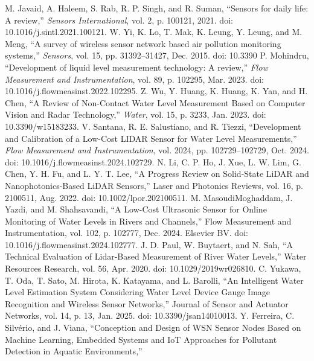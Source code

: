 \documentclass[conference]{IEEEtran}
\begin{document}
\begin{thebibliography}{00}
    
 M. Javaid, A. Haleem, S. Rab, R. P. Singh, and R. Suman, ``Sensors for daily life: A review,'' \emph{Sensors International}, vol. 2, p. 100121, 2021. doi: 10.1016/j.sintl.2021.100121.
 W. Yi, K. Lo, T. Mak, K. Leung, Y. Leung, and M. Meng, ``A survey of wireless sensor network based air pollution monitoring systems,'' \emph{Sensors}, vol. 15, pp. 31392--31427, Dec. 2015. doi: 10.3390
 P. Mohindru, ``Development of liquid level measurement technology: A review,'' \emph{Flow Measurement and Instrumentation}, vol. 89, p. 102295, Mar. 2023. doi: 10.1016/j.flowmeasinst.2022.102295.
 Z. Wu, Y. Huang, K. Huang, K. Yan, and H. Chen, ``A Review of Non-Contact Water Level Measurement Based on Computer Vision and Radar Technology,'' \emph{Water}, vol. 15, p. 3233, Jan. 2023. doi: 10.3390/w15183233.
 V. Santana, R. E. Salustiano, and R. Tiezzi, ``Development and Calibration of a Low-Cost LIDAR Sensor for Water Level Measurements,'' \emph{Flow Measurement and Instrumentation}, vol. 2024, pp. 102729--102729, Oct. 2024. doi: 10.1016/j.flowmeasinst.2024.102729.
 N. Li, C. P. Ho, J. Xue, L. W. Lim, G. Chen, Y. H. Fu, and L. Y. T. Lee, 
``A Progress Review on Solid-State LiDAR and Nanophotonics-Based LiDAR Sensors,'' 
Laser and Photonics Reviews, vol. 16, p. 2100511, Aug. 2022. doi: 10.1002/lpor.202100511.
 M. MasoudiMoghaddam, J. Yazdi, and M. Shahsavandi, 
``A Low-Cost Ultrasonic Sensor for Online Monitoring of Water Levels in Rivers and Channels,'' 
Flow Measurement and Instrumentation, vol. 102, p. 102777, Dec. 2024. Elsevier BV. doi: 10.1016/j.flowmeasinst.2024.102777.
 J. D. Paul, W. Buytaert, and N. Sah, 
``A Technical Evaluation of Lidar-Based Measurement of River Water Levels,'' 
Water Resources Research, vol. 56, Apr. 2020. doi: 10.1029/2019wr026810.
 C. Yukawa, T. Oda, T. Sato, M. Hirota, K. Katayama, and L. Barolli, 
``An Intelligent Water Level Estimation System Considering Water Level Device Gauge Image Recognition and Wireless Sensor Networks,'' 
Journal of Sensor and Actuator Networks, vol. 14, p. 13, Jan. 2025. doi: 10.3390/jsan14010013.
 Y. Ferreira, C. Silvério, and J. Viana, 
``Conception and Design of WSN Sensor Nodes Based on Machine Learning, Embedded Systems and IoT Approaches for Pollutant Detection in Aquatic Environments,'' 

\end{thebibliography}
\end{document}
